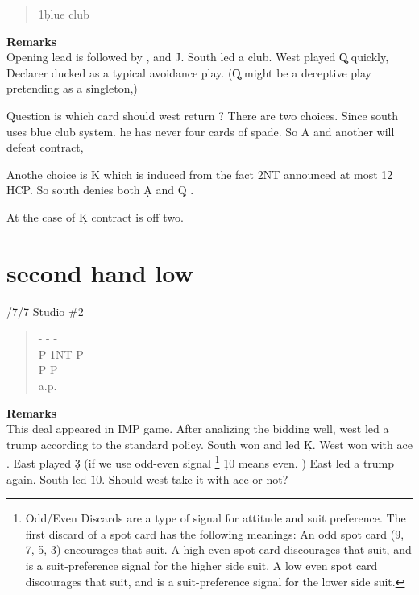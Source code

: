 {\begin{quote}
\begin{bidding}
\end{bidding}
1\d blue club
 \end{quote}
{\bf Remarks}\\

Opening lead is  followed by  , and \s J. South led a
club. West played \c Q quickly, Declarer ducked as 
a typical avoidance play.
(\c Q might be a deceptive play pretending as a singleton,)

Question is which card should west return ? There are two choices.
Since south uses blue club system. he has never four cards of spade.
So \s A and another will  defeat contract,

Anothe choice is \d K  which is induced from the fact 2NT announced 
at most 12 HCP. So south denies both \d A and \d Q .

At the case of \d K contract is off two.

\section{second hand low}%
/7/7 Studio \#2
\begin{quote}
%
  {}%
  {}%
  {}%
  {}%
\end{quote}
\begin{quote}
\begin{bidding}
- \> - \> -\s   \\
P \> 1NT \> P \c \\
P \s \> P \s \\  
a.p. \\
\end{bidding}
 \end{quote}
{\bf Remarks}\\

This deal appeared in IMP game.
After analizing the bidding well, west led a trump
according to the standard policy. South won and led 
\d K. West won with ace . 
East played \d 3 (if we use odd-even signal \footnote{Odd/Even Discards  are a type of signal for attitude and suit preference. 
The first discard of a spot card has the following meanings:
An odd spot card (9, 7, 5, 3) encourages that suit.
A high even spot card discourages that suit, and is a suit-preference signal for the higher side suit.
A low even spot card discourages that suit, and is a suit-preference signal for the lower side suit.
} \d 10 means even.
)
East led a trump  again. South led \h 10. Should west
take it with ace or not?

}
